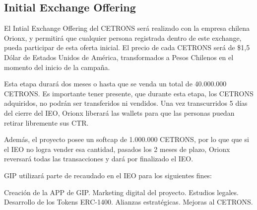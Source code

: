 \subsection{Initial Exchange Offering}

El Intial Exchange Offering del CETRONS será realizado con la empresa chilena Orionx, y permitirá que cualquier persona registrada dentro de este exchange, pueda participar de esta oferta inicial. El precio de cada CETRONS será de \$1,5 Dólar de Estados Unidos de América, transformados a Pesos Chilenos en el momento del inicio de la campaña.

Esta etapa durará dos meses o hasta que se venda un total de 40.000.000 CETRONS. Es importante tener presente, que durante esta etapa, los CETRONS adquiridos, no podrán ser transferidos ni vendidos. Una vez transcurridos 5 días del cierre del IEO, Orionx liberará las wallets para que las personas puedan retirar libremente sus CTR.

Además, el proyecto posee un softcap de 1.000.000 CETRONS, por lo que que si el IEO no logra vender esa cantidad, pasados los 2 meses de plazo, Orionx reversará todas las transacciones y dará por finalizado el IEO.

GIP utilizará parte de recaudado en el IEO para los siguientes fines:

Creación de la APP de GIP.
Marketing digital del proyecto.
Estudios legales.
Desarrollo de los Tokens ERC-1400.
Alianzas estratégicas.
Mejoras al CETRONS.

